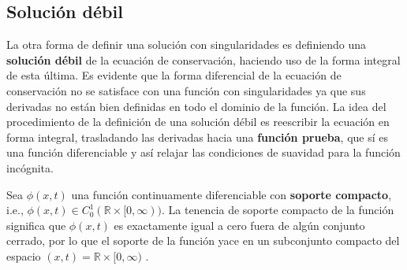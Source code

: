 \subsection{Solución débil}
La otra forma de definir una solución con singularidades es definiendo una \textbf{solución débil} de la ecuación de conservación, haciendo uso de la forma integral de esta última. Es evidente que la forma diferencial de la ecuación de conservación no se satisface con una función con singularidades ya que sus derivadas no están bien definidas en todo el dominio de la función. La idea del procedimiento de la definición de una solución débil es reescribir la ecuación en forma integral, trasladando las derivadas hacia una \textbf{función prueba}, que sí es una función diferenciable y así relajar las condiciones de suavidad para la función incógnita.

Sea $\phi(x,t)$ una función continuamente diferenciable con \textbf{soporte compacto}, i.e., $\phi(x,t) \in C_{0}^{1} (\mathbb{R} \times [0, \infty))$. La tenencia de soporte compacto de la función significa que $\phi(x,t)$ es exactamente igual a cero fuera de algún conjunto cerrado, por lo que el soporte de la función yace en un subconjunto compacto del espacio $(x,t) = \mathbb{R} \times [0, \infty)$ \cite{Cameron}.

